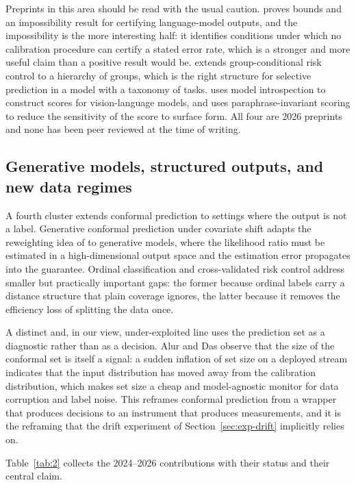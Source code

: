 \documentclass[a4paper,longmktitle]{cas-sc}
\begin{document}
Preprints in this area should be read with the usual caution. \cite{CRC_LLM} proves bounds and an impossibility result for certifying language-model outputs, and the impossibility is the more interesting half: it identifies conditions under which no calibration procedure can certify a stated error rate, which is a stronger and more useful claim than a positive result would be. \cite{HierCRC} extends group-conditional risk control to a hierarchy of groups, which is the right structure for selective prediction in a model with a taxonomy of tasks. \cite{IntroConformal} uses model introspection to construct scores for vision-language models, and \cite{ParaCP} uses paraphrase-invariant scoring to reduce the sensitivity of the score to surface form. All four are 2026 preprints and none has been peer reviewed at the time of writing.

\subsection{Generative models, structured outputs, and new data regimes}

A fourth cluster extends conformal prediction to settings where the output is not a label. Generative conformal prediction under covariate shift \cite{Li2026gen} adapts the reweighting idea of \cite{Tibshirani2019} to generative models, where the likelihood ratio must be estimated in a high-dimensional output space and the estimation error propagates into the guarantee. Ordinal classification \cite{OrdinalCRC} and cross-validated risk control \cite{XVCrc} address smaller but practically important gaps: the former because ordinal labels carry a distance structure that plain coverage ignores, the latter because it removes the efficiency loss of splitting the data once.

A distinct and, in our view, under-exploited line uses the prediction set as a diagnostic rather than as a decision. Alur and Das \cite{Alur2026} observe that the size of the conformal set is itself a signal: a sudden inflation of set size on a deployed stream indicates that the input distribution has moved away from the calibration distribution, which makes set size a cheap and model-agnostic monitor for data corruption and label noise. This reframes conformal prediction from a wrapper that produces decisions to an instrument that produces measurements, and it is the reframing that the drift experiment of Section~\ref{sec:exp-drift} implicitly relies on.

Table~\ref{tab:2} collects the 2024--2026 contributions with their status and their central claim.
\end{document}
